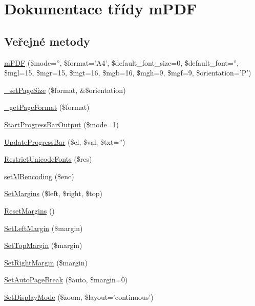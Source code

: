 \hypertarget{classm_p_d_f}{\section{Dokumentace třídy m\-P\-D\-F}
\label{classm_p_d_f}
}
\subsection*{Veřejné metody}
\begin{DoxyCompactItemize}
\item 
\hyperlink{classm_p_d_f_a7c50eca9441c87f13dab2e91d2a31b2c}{m\-P\-D\-F} (\$mode='', \$format='A4', \$default\-\_\-font\-\_\-size=0, \$default\-\_\-font='', \$mgl=15, \$mgr=15, \$mgt=16, \$mgb=16, \$mgh=9, \$mgf=9, \$orientation='P')
\item 
\hyperlink{classm_p_d_f_a63c8528c91a7ecb6a3bbc7b7a68116c8}{\-\_\-set\-Page\-Size} (\$format, \&\$orientation)
\item 
\hyperlink{classm_p_d_f_a2879e8821e3f8ea0b5a76b674e49a652}{\-\_\-get\-Page\-Format} (\$format)
\item 
\hyperlink{classm_p_d_f_a8ac7ffeb959b4e61b9e1f7c11972dc07}{Start\-Progress\-Bar\-Output} (\$mode=1)
\item 
\hyperlink{classm_p_d_f_abd9421c07411e1adfa78c0dde89d30f9}{Update\-Progress\-Bar} (\$el, \$val, \$txt='')
\item 
\hyperlink{classm_p_d_f_adc21acb997c22c59f29ba44171b7f727}{Restrict\-Unicode\-Fonts} (\$res)
\item 
\hyperlink{classm_p_d_f_ab4fb84d7438aea3ed0ceb7619d2e0948}{set\-M\-Bencoding} (\$enc)
\item 
\hyperlink{classm_p_d_f_afe2819081aaae4b16499773d71205086}{Set\-Margins} (\$left, \$right, \$top)
\item 
\hyperlink{classm_p_d_f_a691c1ff25520aa649074c70fd2b4627d}{Reset\-Margins} ()
\item 
\hyperlink{classm_p_d_f_a84c3355e5787baf72d02b7c2bb4ef282}{Set\-Left\-Margin} (\$margin)
\item 
\hyperlink{classm_p_d_f_ad56fce2f40e7a9f5675eda974ce772bf}{Set\-Top\-Margin} (\$margin)
\item 
\hyperlink{classm_p_d_f_ae669d929f3561e666acbb067b4584737}{Set\-Right\-Margin} (\$margin)
\item 
\hyperlink{classm_p_d_f_a83175493eaecd08c5c0330e8c77ca66f}{Set\-Auto\-Page\-Break} (\$auto, \$margin=0)
\item 
\hyperlink{classm_p_d_f_af3df0bec502daa790440e588ee3cc47e}{Set\-Display\-Mode} (\$zoom, \$layout='continuous')

\end{DoxyCompactItemize}
